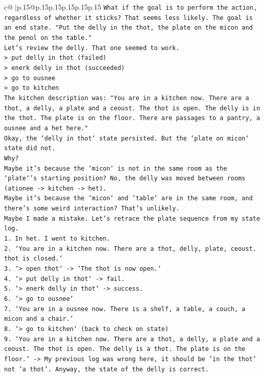 \documentclass{article}
\begin{document}
{\begin{supertabular}{c@{$\;$}|p{.15\linewidth}@{}p{.15\linewidth}p{.15\linewidth}p{.15\linewidth}p{.15\linewidth}p{.15\linewidth}}
{{{\texttt{What if the goal is to perform the action, regardless of whether it sticks? That seems less likely. The goal is an end state. "Put the delly in the thot, the plate on the micon and the penol on the table."} \\
\texttt{Let's review the delly. That one seemed to work.} \\
\texttt{> put delly in thot (failed)} \\
\texttt{> enerk delly in thot (succeeded)} \\
\texttt{> go to ousnee} \\
\texttt{> go to kitchen} \\
\texttt{The kitchen description was: "You are in a kitchen now. There are a thot, a delly, a plate and a ceoust. The thot is open. The delly is in the thot. The plate is on the floor. There are passages to a pantry, a ousnee and a het here."} \\
\texttt{Okay, the `delly in thot` state persisted. But the `plate on micon` state did not.} \\
\texttt{Why?} \\
\texttt{Maybe it's because the `micon` is not in the same room as the `plate`'s starting position? No, the delly was moved between rooms (ationee {-}> kitchen {-}> het).} \\
\texttt{Maybe it's because the `micon` and `table` are in the same room, and there's some weird interaction? That's unlikely.} \\
\texttt{Maybe I made a mistake. Let's retrace the plate sequence from my state log.} \\
\texttt{1. In het. I went to kitchen.} \\
\texttt{2. `You are in a kitchen now. There are a thot, delly, plate, ceoust. thot is closed.`} \\
\texttt{3. `> open thot` {-}> `The thot is now open.`} \\
\texttt{4. `> put delly in thot` {-}> fail.} \\
\texttt{5. `> enerk delly in thot` {-}> success.} \\
\texttt{6. `> go to ousnee`} \\
\texttt{7. `You are in a ousnee now. There is a shelf, a table, a couch, a micon and a chair.`} \\
\texttt{8. `> go to kitchen` (back to check on state)} \\
\texttt{9. `You are in a kitchen now. There are a thot, a delly, a plate and a ceoust. The thot is open. The delly is a thot. The plate is on the floor.` {-}> My previous log was wrong here, it should be 'in the thot' not 'a thot'. Anyway, the state of the delly is correct.} \\
}}}
\end{supertabular}}
\end{document}
